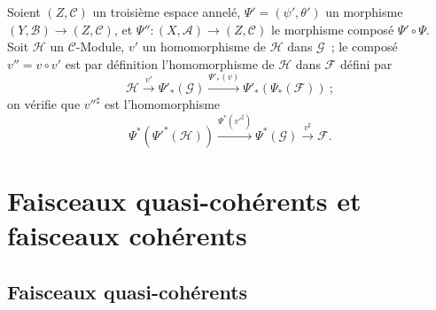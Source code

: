 \begin{env}[4.4.8]
\label{0.4.4.8-fr}
Soient $(Z,\mathcal{C})$ un troisième espace annelé,
$\Psi'=(\psi',\theta')$ un morphisme $(Y,\mathcal{B})\to(Z,\mathcal{C})$, et
$\Psi'':(X,\mathcal{A})\to(Z,\mathcal{C})$ le morphisme composé
$\Psi'\circ\Psi$. Soit $\mathcal{H}$ un $\mathcal{C}$-Module, $v'$ un
homomorphisme de $\mathcal{H}$ dans $\mathcal{G}$~; le composé
$v''=v\circ v'$ est par définition l'homomorphisme de $\mathcal{H}$ dans
$\mathcal{F}$ défini par
\[
  \mathcal{H}\xrightarrow{v'}\Psi'_*(\mathcal{G})
  \xrightarrow{\Psi'_*(v)}\Psi'_*(\Psi_*(\mathcal{F}))~;
\]
on vérifie que ${v''}^\sharp$ est l'homomorphisme
\[
  \Psi^*({\Psi'}^*(\mathcal{H}))
  \xrightarrow{\Psi^*({v'}^\sharp)}
  \Psi^*(\mathcal{G})
  \xrightarrow{v^\sharp}\mathcal{F}.
\]
\end{env}

\section{Faisceaux quasi-cohérents et faisceaux cohérents}
\label{section:0.5-fr}

\subsection{Faisceaux quasi-cohérents}
\label{subsection:0.5.1-fr}

